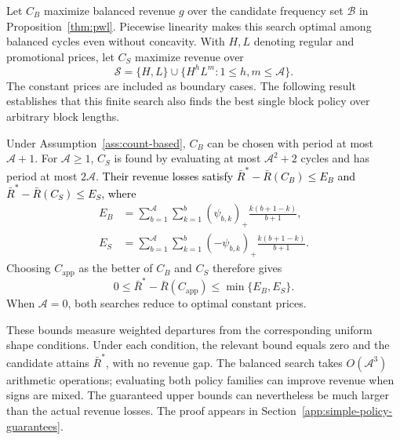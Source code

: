 Let \(C_B\) maximize balanced revenue \(g\) over the candidate frequency set \(\mathcal B\) in Proposition~\ref{thm:pwl}. Piecewise linearity makes this search optimal among balanced cycles even without concavity. With \(H,L\) denoting regular and promotional prices, let \(C_S\) maximize revenue over
\[
 \mathcal S=\{H,L\}\cup
 \{H^hL^m:1\le h,m\le\mathcal A\}.
\]
The constant prices are included as boundary cases. The following result establishes that this finite search also finds the best single block policy over arbitrary block lengths.

\begin{proposition}
\label{prop:mixed-curvature-guarantee}
Under Assumption~\ref{ass:count-based}, \(C_B\) can be chosen with period at most \(\mathcal A+1\). For \(\mathcal A\ge1\), \(C_S\) is found by evaluating at most \(\mathcal A^2+2\) cycles and has period at most \(2\mathcal A\). \textcolor{black}{Their revenue losses satisfy \(\bar R^*-\bar R(C_B)\le E_B\) and \(\bar R^*-\bar R(C_S)\le E_S\), where}
\begin{equation}\label{eq:mixed-curvature-guarantee}
\begin{aligned}
 E_B&=\sum_{b=1}^{\mathcal A}\sum_{k=1}^{b}
 (\psi_{b,k})_+\frac{k(b+1-k)}{b+1},\\
 E_S&=\sum_{b=1}^{\mathcal A}\sum_{k=1}^{b}
 (-\psi_{b,k})_+\frac{k(b+1-k)}{b+1}.
\end{aligned}
\end{equation}
Choosing \(C_{\mathrm{app}}\) as the better of \(C_B\) and \(C_S\) therefore gives
\[
 0\le\bar R^*-\bar R(C_{\mathrm{app}})
 \le\min\{E_B,E_S\}.
\]
When \(\mathcal A=0\), both searches reduce to optimal constant prices.
\end{proposition}

\begingroup\color{black}
These bounds measure weighted departures from the corresponding uniform shape conditions. Under each condition, the relevant bound equals zero and the candidate attains \(\bar R^*\), with no revenue gap. The balanced search takes \(O(\mathcal A^3)\) arithmetic operations; evaluating both policy families can improve revenue when signs are mixed. The guaranteed upper bounds can nevertheless be much larger than the actual revenue losses. The proof appears in Section~\ref{app:simple-policy-guarantees}.
\par\endgroup

